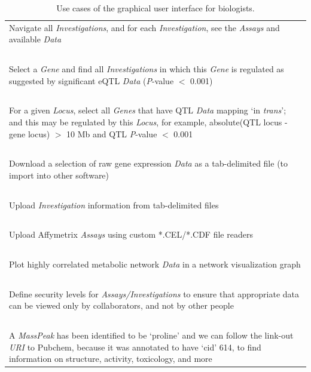 \begin{table}
\begin{tabulary}{\linewidth}{L}
  \hline
  Navigate all \textsl{Investigations}, and for each \textsl{Investigation}, see the \textsl{Assays} and available \textsl{Data}\\
  ~\\
  Select a \textsl{Gene} and find all \textsl{Investigations} in which this \textsl{Gene} is regulated as suggested by significant eQTL \textsl{Data} (\textsl{P}-value $<$ 0.001)\\
  ~\\
  For a given \textsl{Locus}, select all \textsl{Genes} that have QTL \textsl{Data} mapping ‘in \textsl{trans}’; and this may be regulated by this \textsl{Locus}, for example, absolute(QTL locus - gene locus) $>$ 10 Mb and QTL \textsl{P}-value $<$ 0.001\\
  ~\\
  Download a selection of raw gene expression \textsl{Data} as a tab-delimited file (to import into other software)\\
  ~\\
  Upload \textsl{Investigation} information from tab-delimited files\\
  ~\\
  Upload Affymetrix \textsl{Assays} using custom *.CEL/*.CDF file readers\\
  ~\\
  Plot highly correlated metabolic network \textsl{Data} in a network visualization graph\\
  ~\\
  Define security levels for \textsl{Assays/Investigations} to ensure that appropriate data can be viewed only by collaborators, and not by other people\\
  ~\\
  A \textsl{MassPeak} has been identified to be ‘proline’ and we can follow the link-out \textsl{URI} to Pubchem\cite{xgap_pubchem}, because it was annotated to have ‘cid’ 614, to find information on structure, activity, toxicology, and more\\
  \hline
\end{tabulary}
\caption[Use cases of the graphical user interface]{Use cases of the graphical user interface for biologists.}
\label{table:xgap_gui_usecases}
\end{table}

